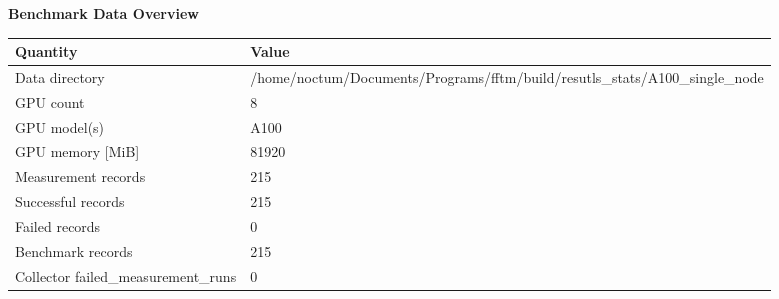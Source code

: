 \documentclass{article}
\begin{document}
\begin{center}
{\fontsize{8.0pt}{9.4pt}\selectfont
\textbf{Benchmark Data Overview}

\vspace{0.6em}
\begin{tabular}{ll}
\hline
Quantity & Value \\
\hline
Data directory & /home/noctum/Documents/Programs/fftm/build/resutls\_stats/A100\_single\_node \\
GPU count & 8 \\
GPU model(s) & A100 \\
GPU memory [MiB] & 81920 \\
Measurement records & 215 \\
Successful records & 215 \\
Failed records & 0 \\
Benchmark records & 215 \\
Collector failed\_measurement\_runs & 0 \\
\hline
\end{tabular}
}
\end{center}
\end{document}

